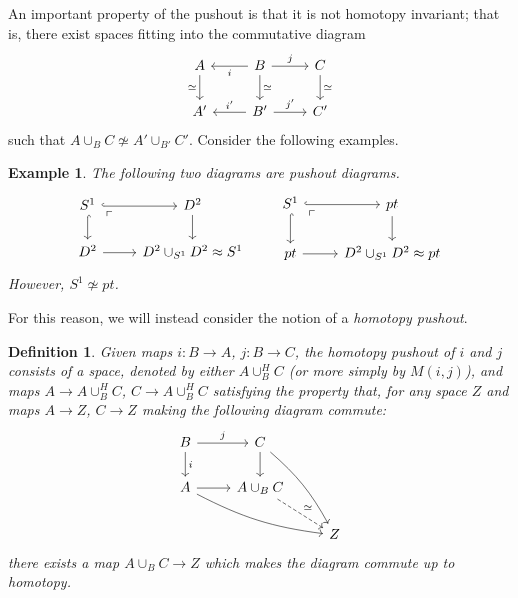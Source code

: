 \documentclass{article}
\newtheorem{definition}[theorem]{Definition}
\newtheorem{example}[theorem]{Example}
\newtheorem{proposed work}[theorem]{Proposed Work}
\theoremstyle{definition}
\begin{document}
An important property of the pushout is that it is not homotopy invariant; that is, there exist spaces fitting into the commutative diagram
\begin{equation*}
\begin{tikzcd}
A \arrow[d,swap, "\simeq"] & B \arrow[l, "i"] \arrow[r, "j"] \arrow[d, "\simeq"]& C \arrow[d, "\simeq"] \\
A' & B' \arrow[l,swap, "i'"] \arrow[r, "j'"] & C'
\end{tikzcd}
\end{equation*}
such that $A \cup_B C \not\simeq A' \cup_{B'} C'$. Consider the following examples.
\begin{example}
The following two diagrams are pushout diagrams.
\begin{equation*}
\begin{tikzcd}
S^1 \arrow[r,hook] \arrow[d,hook] \arrow[dr, phantom, "\ulcorner", very near start] & D^2 \arrow[d] \\
D^2 \arrow[r] & D^2 \cup_{S^1} D^2 \approx S^1
\end{tikzcd} \qquad
\begin{tikzcd}
S^1 \arrow[r,hook] \arrow[d,hook] \arrow[dr, phantom, "\ulcorner", very near start] & pt \arrow[d] \\
pt \arrow[r]& D^2 \cup_{S^1} D^2 \approx pt
\end{tikzcd}
\end{equation*}
However, $S^1 \not\simeq pt$. 
\end{example}

For this reason, we will instead consider the notion of a \emph{homotopy pushout}.

\begin{definition}
Given maps $i : B \to A$, $j: B \to C$, the \emph{homotopy pushout} of $i$ and $j$ consists of a space, denoted by either $A \cup_B^H C$ (or more simply by $M(i,j)$), and maps $A \to A \cup_B^H C$, $C \to A \cup_B^H C$ satisfying the property that, for any space $Z$ and maps $A \to Z$, $C \to Z$ making the following diagram commute:
\begin{equation*}
\begin{tikzcd}
B \arrow[r, "j"] \arrow[d,"i"] & C \arrow[d] \arrow[ddr, bend left=10] \\
A \arrow[r] \arrow[drr, bend right=10] & A \cup_B C \arrow[dashed, "\simeq", dr] \\
& & Z
\end{tikzcd}
\end{equation*}
there exists a map $A \cup_B C \to Z$ which makes the diagram commute up to homotopy.
\end{definition}
\end{document}
